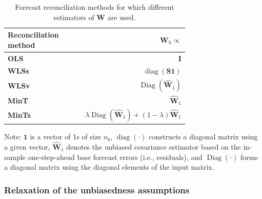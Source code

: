 \documentclass[
  11pt]{article}
\begin{document}
\begin{table}[!h]
\caption{Forecast reconciliation methods for which different estimators of $\bm{W}$ are used.}\label{tbl-bench}
\centering
\begin{threeparttable}
\begin{tabular}{p{0.7\linewidth}r}
\toprule
Reconciliation method & $\bm{W}_h \propto$\\
\midrule
\textbf{OLS} \citep{Hyndman2011-sd} & $\bm{I}$\\
\textbf{WLSs} \citep{Athanasopoulos2017-jj} & $\operatorname{diag}(\bm{S} \bm{1})$\\
\textbf{WLSv} \citep{Hyndman2016-cz} & $\operatorname{Diag}(\hat{\bm{W}}_1)$\\
\textbf{MinT} \citep{Wickramasuriya2019-fc} & $\hat{\bm{W}}_1$\\
\textbf{MinTs} \citep{Wickramasuriya2019-fc} & $\lambda\operatorname{Diag}(\hat{\bm{W}}_1) + (1-\lambda)\hat{\bm{W}}_1$\\
\bottomrule
\end{tabular}
\begin{tablenotes}[para]
\item Note: $\bm{1}$ is a vector of 1s of size $n_b$, $\operatorname{diag}(\cdot)$ constructs a diagonal matrix using a given vector, $\hat{\bm{W}}_1$ denotes the unbiased covariance estimator based on the in-sample one-step-ahead base forecast errors (i.e., residuals), and $\operatorname{Diag}(\cdot)$ forms a diagonal matrix using the diagonal elements of the input matrix.
\end{tablenotes}
\end{threeparttable}
\end{table}

\hypertarget{relaxation-of-the-unbiasedness-assumptions}{%
\subsubsection*{Relaxation of the unbiasedness
assumptions}\label{relaxation-of-the-unbiasedness-assumptions}}
\end{document}
